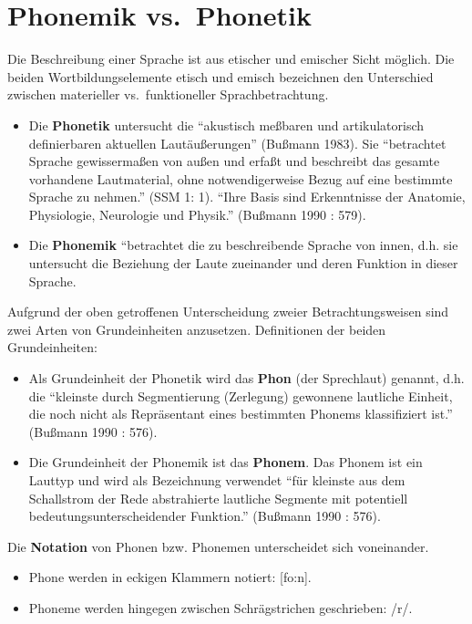 \documentclass[
  letterpaper,
]{scrbook}
\begin{document}
\hypertarget{phonemik-vs.-phonetik}{%
\section{Phonemik vs.~Phonetik}\label{phonemik-vs.-phonetik}}

Die Beschreibung einer Sprache ist aus etischer und emischer Sicht
möglich. Die beiden Wortbildungselemente etisch und emisch bezeichnen
den Unterschied zwischen materieller vs.~funktioneller
Sprachbetrachtung.

\begin{itemize}
\item
  Die \textbf{Phonetik} untersucht die ``akustisch meßbaren und
  artikulatorisch definierbaren aktuellen Lautäußerungen'' (Bußmann
  1983). Sie ``betrachtet Sprache gewissermaßen von außen und erfaßt und
  beschreibt das gesamte vorhandene Lautmaterial, ohne notwendigerweise
  Bezug auf eine bestimmte Sprache zu nehmen.'' (SSM 1: 1). ``Ihre Basis
  sind Erkenntnisse der Anatomie, Physiologie, Neurologie und Physik.''
  (Bußmann 1990 : 579).
\item
  Die \textbf{Phonemik} ``betrachtet die zu beschreibende Sprache von
  innen, d.h. sie untersucht die Beziehung der Laute zueinander und
  deren Funktion in dieser Sprache.
\end{itemize}

Aufgrund der oben getroffenen Unterscheidung zweier Betrachtungsweisen
sind zwei Arten von Grundeinheiten anzusetzen. Definitionen der beiden
Grundeinheiten:

\begin{itemize}
\item
  Als Grundeinheit der Phonetik wird das \textbf{Phon} (der Sprechlaut)
  genannt, d.h. die ``kleinste durch Segmentierung (Zerlegung) gewonnene
  lautliche Einheit, die noch nicht als Repräsentant eines bestimmten
  Phonems klassifiziert ist.'' (Bußmann 1990 : 576).
\item
  Die Grundeinheit der Phonemik ist das \textbf{Phonem}. Das Phonem ist
  ein Lauttyp und wird als Bezeichnung verwendet ``für kleinste aus dem
  Schallstrom der Rede abstrahierte lautliche Segmente mit potentiell
  bedeutungsunterscheidender Funktion.'' (Bußmann 1990 : 576).
\end{itemize}

Die \textbf{Notation} von Phonen bzw. Phonemen unterscheidet sich
voneinander.

\begin{itemize}
\item
  Phone werden in eckigen Klammern notiert: {[}fo:n{]}.
\item
  Phoneme werden hingegen zwischen Schrägstrichen geschrieben: /r/.
\end{itemize}
\end{document}
